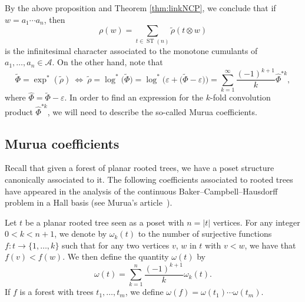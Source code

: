 \documentclass[pdftex]{sigma}%
\numberwithin{equation}{section}
\newcommand{\A}{\mathcal{A}}
\newcommand{\ST}{\operatorname{ST}}
\begin{document}
By the above proposition and Theorem \ref{thm:linkNCP}, we conclude that if $w=a_1\cdots a_n$, then
\begin{equation}
\label{eq:rhoiota}
\rho(w) = \sum_{t\in \ST(n)} \tilde{\rho}(t\otimes w)
\end{equation}
is the infinitesimal character associated to the monotone cumulants of $a_1,\dots,a_n\in \A$. On the other hand, note that
\[
	\tilde\Phi
	= \exp^*(\tilde\rho) \ \Leftrightarrow \ \tilde\rho
	= \log^*\big(\tilde\Phi\big)
	= \log^*\big(\varepsilon + \big(\tilde\Phi - \varepsilon\big)\big)
	= \sum_{k=1}^\infty \frac{(-1)^{k+1}}{k} \hat\Phi^{* k},
\]
where $\hat\Phi = \tilde\Phi - \varepsilon$. In order to find an expression for the $k$-fold convolution product $\hat\Phi^{*k}$, we will need to describe the so-called Murua coefficients.


\subsection{Murua coefficients}
\label{ssec:Murua}

Recall that given a forest of planar rooted trees, we have a poset structure canonically associated to it. The following coefficients associated to rooted trees have appeared in the analysis of the continuous Baker--Campbell--Hausdorff problem in a Hall basis (see Murua's article~\cite{Murua}).

\begin{Definition}
Let $t$ be a planar rooted tree seen as a poset with $n = |t|$ vertices. For any integer $0 < k< n+1$, we denote by $\omega_k(t)$ to the number of surjective functions $f\colon t\to \{1,\dots,k\}$ such that for any two vertices $v$, $w$ in $t$ with $v<w$, we have that $f(v)<f(w)$. We then define the quantity $\omega(t)$ by
\begin{equation}\label{eq:muruacoeff}
\omega(t) = \sum_{k=1}^n \frac{(-1)^{k+1}}{k} \omega_k(t).
\end{equation}
If $f$ is a forest with trees $t_1,\dots, t_m$, we define $\omega(f) = \omega(t_1)\cdots \omega(t_m).$
\end{Definition}
\end{document}
